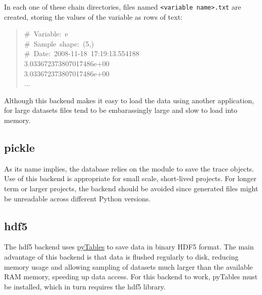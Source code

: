 In each one of these chain directories, files named \texttt{<variable name>.txt}
are created, storing the values of the variable as rows of text:
\begin{quote}{\ttfamily \raggedright \noindent
{\#}~Variable:~e~\\
{\#}~Sample~shape:~(5,)~\\
{\#}~Date:~2008-11-18~17:19:13.554188~\\
3.033672373807017486e+00~\\
3.033672373807017486e+00~\\
...
}\end{quote}

Although this backend makes it easy to load the data using another application,
for large datasets files tend to be embarassingly large and slow to load
into memory.



\hypertarget{pickle}{}
\subsection*{pickle}
\label{pickle}

As its name implies, the  database relies on the  module to save the trace objects. Use of this backend is appropriate for small scale, short-lived projects. For longer term or larger projects, the  backend should be avoided since generated files might be unreadable across different Python versions.



\hypertarget{hdf5}{}
\subsection*{hdf5}
\label{hdf5}

The hdf5 backend uses \href{http://www.pytables.org/moin}{pyTables} to save data in binary HDF5 format. The main advantage of this backend is that data is flushed regularly to disk, reducing memory usage and allowing sampling of datasets much larger than the available RAM memory, speeding up data access. For this backend to work, pyTables must be installed, which in turn requires the hdf5 library.



